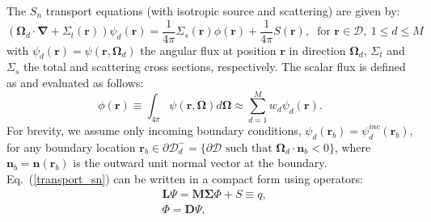 \documentclass{mc2013}
\newcommand\bn{\boldsymbol{\nabla}}
\newcommand\bo{\boldsymbol{\Omega}}
\newcommand\br{\mathbf{r}}
\newcommand\bs{\boldsymbol}
\newcommand\mc{\mathcal}
\renewcommand{\(}{\left(}
\renewcommand{\)}{\right)}
\renewcommand{\[}{\left[}
\renewcommand{\]}{\right]}
\newcommand{\sn}{\ensuremath{S_n}\xspace}
\newcommand{\eqt}[1]{Eq.~(\ref{#1})}                     %
\begin{document}
The \sn transport equations (with isotropic source and scattering) are given by:
%
\begin{equation}
  \(\bo_d\cdot \bn + \Sigma_t(\br)\)\psi_d (\br) = \frac{1}{4\pi} \Sigma_s
  (\br) \phi(\br) + \frac{1}{4\pi} S (\br), \ \textrm{ for } \br \in \mc{D},\
  1 \leq d \leq M
  \label{transport_sn}
\end{equation}
with $\psi_d(\br) = \psi(\br,\bo_d)$ the angular flux at position $\br$ in
direction $\bo_d$, $\Sigma_t$ and $\Sigma_s$ the total and scattering cross
sections, respectively. The scalar flux is
defined as and evaluated as follows:
\begin{equation}
  \phi(\br) \equiv \int_{4\pi} \psi(\br,\bo) d\bo \approx \sum_{d=1}^M w_d
  \psi_d (\br).
\end{equation}
For brevity, we assume only incoming boundary conditions, $\psi_d(\br_b) =
\psi_d^{inc}(\br_b)$, for any boundary location $\br_b \in \partial \mc{D}_d^-
= \{\partial \mc{D} \textrm{ such that }\bo_d \cdot \bs{n}_b <0\}$, where
$\bs{n}_b = \bs{n}(\br_b)$ is the outward unit normal vector at the boundary. 
%
\eqt{transport_sn} can be written in a compact form using operators:
\begin{align}
  & \bs{L} \Psi = \bs{M \Sigma}\Phi + S \equiv q, \label{L_Psi}\\
  &\Phi = \bs{D} \Psi, \label{Phi}
\end{align}
\end{document}
